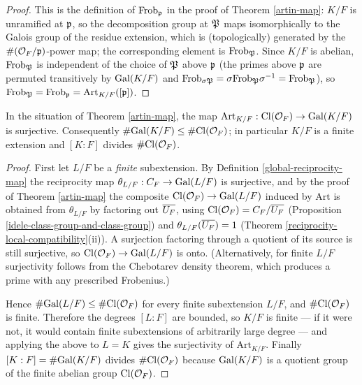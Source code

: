 \begin{proof}
This is the definition of ${\mathrm{Frob}}_{\mathfrak{p}}$ in the proof of Theorem \ref{artin-map}:
$K/F$ is unramified at ${\mathfrak{p}}$, so the decomposition group at ${\mathfrak{P}}$ maps
isomorphically to the Galois group of the residue extension, which is
(topologically) generated by the $\#({\mathcal {O}}_F/{\mathfrak{p}})$-power map; the corresponding
element is ${\mathrm{Frob}}_{\mathfrak{P}}$.
Since $K/F$ is abelian, ${\mathrm{Frob}}_{\mathfrak{P}}$ is independent of the choice of ${\mathfrak{P}}$ above
${\mathfrak{p}}$ (the primes above ${\mathfrak{p}}$ are permuted transitively by ${\mathrm{Gal}}(K/F)$ and
${\mathrm{Frob}}_{\sigma{\mathfrak{P}}}=\sigma{\mathrm{Frob}}_{\mathfrak{P}}\sigma^{-1}={\mathrm{Frob}}_{\mathfrak{P}}$), so
${\mathrm{Frob}}_{\mathfrak{P}}={\mathrm{Frob}}_{\mathfrak{p}}=\mathrm{Art}_{K/F}([{\mathfrak{p}}])$.
\end{proof}

\begin{thm}
\label{artin-map-surjective}
In the situation of Theorem \ref{artin-map}, the map
$\mathrm{Art}_{K/F}:{\mathrm{Cl}}({\mathcal {O}}_F)\to{\mathrm{Gal}}(K/F)$ is surjective.
Consequently $\#{\mathrm{Gal}}(K/F)\leq\#{\mathrm{Cl}}({\mathcal {O}}_F)$; in particular $K/F$ is a finite
extension and $[K:F]$ divides $\#{\mathrm{Cl}}({\mathcal {O}}_F)$.
\end{thm}

\begin{proof}
First let $L/F$ be a \emph{finite} subextension.
By Definition \ref{global-reciprocity-map} the reciprocity map
$\theta_{L/F}:C_F\to{\mathrm{Gal}}(L/F)$ is surjective, and by the proof of Theorem
\ref{artin-map} the composite ${\mathrm{Cl}}({\mathcal {O}}_F)\to{\mathrm{Gal}}(L/F)$ induced by
$\mathrm{Art}$ is obtained from $\theta_{L/F}$ by factoring out
$\overline{U_F}$, using ${\mathrm{Cl}}({\mathcal {O}}_F)=C_F/\overline{U_F}$
(Proposition \ref{idele-class-group-and-class-group}) and
$\theta_{L/F}(\overline{U_F})=1$
(Theorem \ref{reciprocity-local-compatibility}(ii)).
A surjection factoring through a quotient of its source is still surjective, so
${\mathrm{Cl}}({\mathcal {O}}_F)\to{\mathrm{Gal}}(L/F)$ is onto.
(Alternatively, for finite $L/F$ surjectivity follows from the Chebotarev
density theorem, which produces a prime with any prescribed Frobenius.)

Hence $\#{\mathrm{Gal}}(L/F)\leq\#{\mathrm{Cl}}({\mathcal {O}}_F)$ for every finite subextension $L/F$, and
$\#{\mathrm{Cl}}({\mathcal {O}}_F)$ is finite.
Therefore the degrees $[L:F]$ are bounded, so $K/F$ is finite --- if it were
not, it would contain finite subextensions of arbitrarily large degree --- and
applying the above to $L=K$ gives the surjectivity of $\mathrm{Art}_{K/F}$.
Finally $[K:F]=\#{\mathrm{Gal}}(K/F)$ divides $\#{\mathrm{Cl}}({\mathcal {O}}_F)$ because
${\mathrm{Gal}}(K/F)$ is a quotient group of the finite abelian group ${\mathrm{Cl}}({\mathcal {O}}_F)$.
\end{proof}

